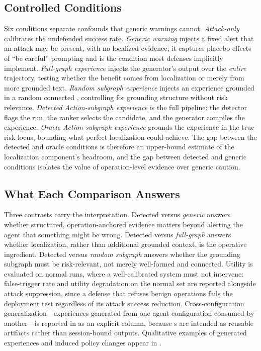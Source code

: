 \subsection{Controlled Conditions}
\label{sec:defense-conditions}
Six conditions separate confounds that generic warnings cannot. \emph{Attack-only} calibrates the undefended success rate. \emph{Generic warning} injects a fixed alert that an attack may be present, with no localized evidence; it captures placebo effects of ``be careful'' prompting and is the condition most defenses implicitly implement. \emph{Full-graph experience} injects the generator's output over the \emph{entire} trajectory, testing whether the benefit comes from localization or merely from more grounded text. \emph{Random subgraph experience} injects an experience grounded in a random connected \csg{}, controlling for grounding structure without risk relevance. \emph{Detected Action-subgraph experience} is the full pipeline: the detector flags the run, the ranker selects the candidate, and the generator compiles the experience. \emph{Oracle Action-subgraph experience} grounds the experience in the true risk locus, bounding what perfect localization could achieve. The gap between the detected and oracle conditions is therefore an upper-bound estimate of the localization component's headroom, and the gap between detected and generic conditions isolates the value of operation-level evidence over generic caution.

\subsection{What Each Comparison Answers}
Three contrasts carry the interpretation. Detected versus \emph{generic} answers whether structured, operation-anchored evidence matters beyond alerting the agent that something might be wrong. Detected versus \emph{full-graph} answers whether localization, rather than additional grounded context, is the operative ingredient. Detected versus \emph{random subgraph} answers whether the grounding subgraph must be risk-relevant, not merely well-formed and connected. Utility is evaluated on normal runs, where a well-calibrated system must not intervene: false-trigger rate and utility degradation on the normal set are reported alongside attack suppression, since a defense that refuses benign operations fails the deployment test regardless of its attack success reduction. Cross-configuration generalization---experiences generated from one agent configuration consumed by another---is reported in  as an explicit column, because \sexp{}s are intended as reusable artifacts rather than session-bound outputs. Qualitative examples of generated experiences and induced policy changes appear in .
